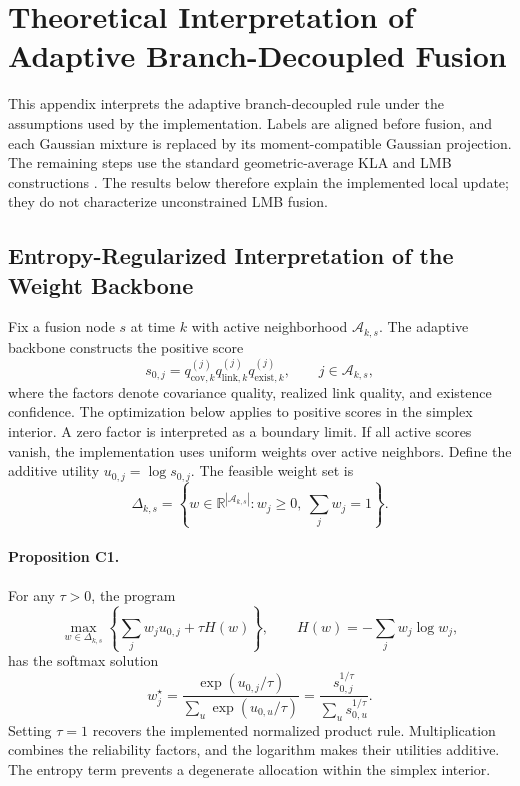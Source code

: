 \section{Theoretical Interpretation of Adaptive Branch-Decoupled Fusion}
\label{app:theory}

This appendix interprets the adaptive branch-decoupled rule under the assumptions used by the implementation. Labels are aligned before fusion, and each Gaussian mixture is replaced by its moment-compatible Gaussian projection. The remaining steps use the standard geometric-average KLA and LMB constructions \cite{Battistelli2014KLA,Hlinka2014ICI,Uney2013EMDPHD,Bandyopadhyay2018LogOP,Vo2014LRFS,Reuter2014LMB,Vo2019MSGLMB}. The results below therefore explain the implemented local update; they do not characterize unconstrained LMB fusion.

\subsection{Entropy-Regularized Interpretation of the Weight Backbone}

Fix a fusion node $s$ at time $k$ with active neighborhood $\mathcal{A}_{k,s}$. The adaptive backbone constructs the positive score
\begin{equation}
s_{0,j}
=
q_{\mathrm{cov},k}^{(j)}
q_{\mathrm{link},k}^{(j)}
q_{\mathrm{exist},k}^{(j)},
\qquad
j \in \mathcal{A}_{k,s},
\end{equation}
where the factors denote covariance quality, realized link quality, and existence confidence. The optimization below applies to positive scores in the simplex interior. A zero factor is interpreted as a boundary limit. If all active scores vanish, the implementation uses uniform weights over active neighbors. Define the additive utility $u_{0,j}=\log s_{0,j}$. The feasible weight set is
\begin{equation}
\Delta_{k,s}
=
\left\{
w \in \mathbb{R}^{|\mathcal{A}_{k,s}|} :
w_j \ge 0,\ \sum_j w_j = 1
\right\}.
\end{equation}

\paragraph{Proposition C1.}
For any $\tau>0$, the program
\begin{equation}
\max_{w \in \Delta_{k,s}}
\left\{
\sum_j w_j u_{0,j}
+
\tau H(w)
\right\},
\qquad
H(w) = -\sum_j w_j \log w_j,
\label{eq:appendix-backbone}
\end{equation}
has the softmax solution
\begin{equation}
w_j^\star
=
\frac{\exp(u_{0,j}/\tau)}{\sum_u \exp(u_{0,u}/\tau)}
=
\frac{s_{0,j}^{1/\tau}}{\sum_u s_{0,u}^{1/\tau}}.
\end{equation}
Setting $\tau=1$ recovers the implemented normalized product rule. Multiplication combines the reliability factors, and the logarithm makes their utilities additive. The entropy term prevents a degenerate allocation within the simplex interior.

